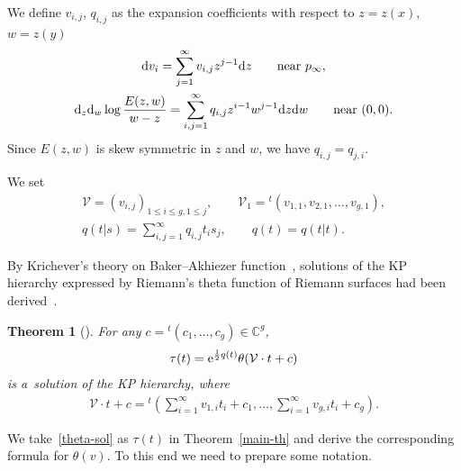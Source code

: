 \documentclass[pdftex]{sigma}
\numberwithin{equation}{section}
\newtheorem{Theorem}{Theorem}[section]
\theoremstyle{definition}
\begin{document}
We define $v_{i,j}$, $q_{i,j}$ as the expansion coefficients with respect to $z=z(x)$, $w=z(y)$
\begin{gather}
{\rm d}v_i=\sum_{j=1}^\infty v_{i,j}z^{j-1}{\rm d}z \qquad \text{near $p_\infty$},
\label{vij}
\\
{\rm d}_z{\rm d}_w\log \frac{E(z,w)}{w-z}=\sum_{i,j=1}^\infty q_{i,j} z^{i-1}w^{j-1}{\rm d}z {\rm d}w
\qquad
\text{near $(0,0)$}.
\label{qij}
\end{gather}
Since $E(z,w)$ is skew symmetric in $z$ and $w$, we have $q_{i,j}=q_{j,i}$.


We set
\begin{gather}
{\mathcal V}=(v_{i,j})_{1\leq i\leq g, 1\leq j},
\qquad
{\mathcal V}_1={}^t(v_{1,1},v_{2,1},\dots ,v_{g,1}),
\label{V1}
\\
q(t|s)=\sum_{i,j=1}^\infty q_{i,j}t_i s_j,
\qquad
q(t)=q(t|t).
\label{qts}
\end{gather}

By Krichever's theory on Baker--Akhiezer function~\cite{Krichever1977}, solutions of the KP hierarchy
expressed by Riemann's theta function of Riemann surfaces had been derived~\cite{KNTY1988,Segal-Wilson1985}.

\begin{Theorem}[\cite{KNTY1988,Segal-Wilson1985}]
For any $c={}^t(c_1,\dots ,c_g) \in {\mathbb C}^g$,
\begin{gather}
\tau(t)={\rm e}^{\frac{1}{2} q(t)}\theta({\mathcal V}\cdot t+c)
\label{theta-sol}
\end{gather}
is a~solution of the KP hierarchy, where
\begin{gather*}
{\mathcal V}\cdot t+c={}^t\left(\sum_{i=1}^\infty v_{1,i}t_i+c_1,\dots ,\sum_{i=1}^\infty v_{g,i}t_i+c_g\right).
\end{gather*}
\end{Theorem}

We take~\eqref{theta-sol} as $\tau(t)$ in Theorem~\ref{main-th} and derive
the corresponding formula for $\theta(v)$.
To this end we need to prepare some notation.
\end{document}

